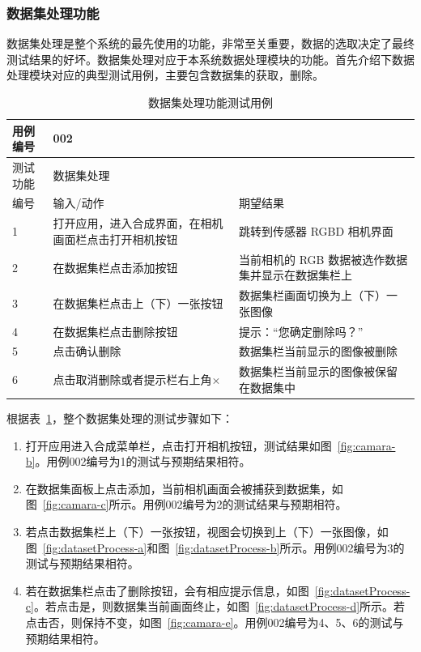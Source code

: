 \subsubsection{数据集处理功能}
数据集处理是整个系统的最先使用的功能，非常至关重要，数据的选取决定了最终测试结果的好坏。数据集处理对应于本系统数据处理模块的功能。首先介绍下数据处理模块对应的典型测试用例，主要包含数据集的获取，删除。

\begin{table}[t]
  \centering
  \small{}\setlength{}
  \caption{数据集处理功能测试用例}
  \begin{tabular}{|p{2cm}<{\centering}|p{4cm}<{\centering}|p{4cm}<{\centering}|}
    \hline
    用例编号 & \multicolumn{2}{|l|}{002}       \\
    \hline
    测试功能 & \multicolumn{2}{|l|}{数据集处理}       \\
    \hline
    编号 & 输入/动作 & 期望结果 \\
    \hline
    1 & 打开应用，进入合成界面，在相机画面栏点击打开相机按钮 & 跳转到传感器 RGBD 相机界面 \\
    \hline
    2 & 在数据集栏点击添加按钮 & 当前相机的 RGB 数据被选作数据集并显示在数据集栏上 \\
    \hline
    3 & 在数据集栏点击上（下）一张按钮 & 数据集栏画面切换为上（下）一张图像 \\
    \hline
    4 & 在数据集栏点击删除按钮 & 提示：“您确定删除吗？” \\
    \hline
    5 & 点击确认删除 & 数据集栏当前显示的图像被删除 \\
    \hline
    6 & 点击取消删除或者提示栏右上角$\times$ & 数据集栏当前显示的图像被保留在数据集中 \\
    \hline
  \end{tabular}
  \label{tab:getdataset}
\end{table}

根据表~\ref{tab:getdataset}，整个数据集处理的测试步骤如下：
\begin{enumerate}
    \item[1)] 打开应用进入合成菜单栏，点击打开相机按钮，测试结果如图~\ref{fig:camara-b}。用例002编号为1的测试与预期结果相符。
    \item[2)] 在数据集面板上点击添加，当前相机画面会被捕获到数据集，如图~\ref{fig:camara-c}所示。用例002编号为2的测试结果与预期相符。
    \item[3)] 若点击数据集栏上（下）一张按钮，视图会切换到上（下）一张图像，如图~\ref{fig:datasetProcess-a}和图~\ref{fig:datasetProcess-b}所示。用例002编号为3的测试与预期结果相符。
    \item[4)] 若在数据集栏点击了删除按钮，会有相应提示信息，如图~\ref{fig:datasetProcess-c}。若点击是，则数据集当前画面终止，如图~\ref{fig:datasetProcess-d}所示。若点击否，则保持不变，如图~\ref{fig:camara-e}。用例002编号为4、5、6的测试与预期结果相符。
\end{enumerate}


